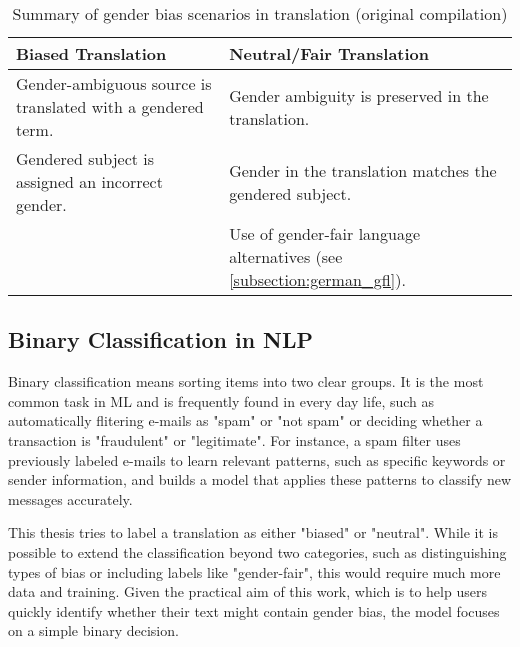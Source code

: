     \begin{table}[htb]
    \centering
    \begin{tabularx}{\linewidth}{X | X}
        \toprule
        \textbf{Biased Translation} & \textbf{Neutral/Fair Translation} \\
        \midrule
        Gender-ambiguous source is translated with a gendered term. & 
        Gender ambiguity is preserved in the translation. \\
        \addlinespace[0.5em]
        Gendered subject is assigned an incorrect gender. & 
        Gender in the translation matches the gendered subject. \\
        \addlinespace[0.5em]
        \multicolumn{1}{c|}{—} & 
        Use of gender-fair language alternatives (see \autoref{subsection:german_gfl}). \\
        \bottomrule
    \end{tabularx}
    \caption[Summary of gender bias scenarios in translation]{Summary of gender bias scenarios in translation (original compilation)}
    \label{tab:overview_bias_neutral}
    \end{table}

    \subsection{Binary Classification in NLP}
    Binary classification means sorting items into two clear groups. It is the most common task in ML and is frequently found in every day life, such as automatically flitering e-mails as "spam" or "not spam" \parencite{quemyBinaryClassificationUnstructured2019} or deciding whether a transaction is "fraudulent" or "legitimate". For instance, a spam filter uses previously labeled e-mails to learn relevant patterns, such as specific keywords or sender information, and builds a model that applies these patterns to classify new messages accurately. 
    
    This thesis tries to label a translation as either "biased" or "neutral". While it is possible to extend the classification beyond two categories, such as distinguishing types of bias or including labels like "gender-fair", this would require much more data and training. Given the practical aim of this work, which is to help users quickly identify whether their text might contain gender bias, the model focuses on a simple binary decision.


